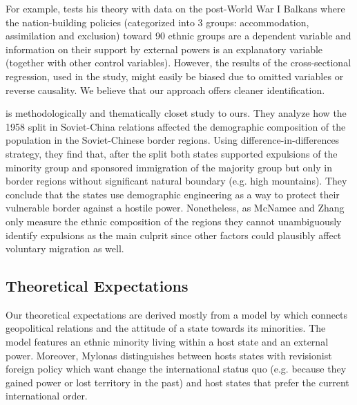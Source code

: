 For example, \citet{mylonas_politics_2013} tests his theory with data on the post-World War I Balkans where the nation-building policies (categorized into 3 groups: accommodation, assimilation and exclusion)  toward  90 ethnic groups are a dependent variable and information on their support by external powers is an explanatory variable (together with other control variables). However, the results of the cross-sectional regression, used in the study, might easily be biased due to omitted variables or reverse causality. We believe that our approach offers cleaner identification.



\citet{mcnamee_demographic_2019} is methodologically and thematically closet study to ours. They analyze how the 1958 split in Soviet-China relations affected the demographic composition of the population in the Soviet-Chinese border regions.
Using difference-in-differences strategy, they find that, after the split  both states supported expulsions  of the minority group and sponsored immigration of the majority group but only in border regions without significant natural boundary (e.g. high mountains). They conclude that the states use demographic engineering as a way to protect their vulnerable border against a hostile power. Nonetheless, as McNamee and Zhang only measure the ethnic composition of the regions they cannot unambiguously identify expulsions as the main culprit since other factors could plausibly affect voluntary migration as well. %


\subsection{Theoretical Expectations}
Our theoretical expectations are  derived mostly from a model by    \citet{mylonas_politics_2013} which connects geopolitical relations and  the attitude of a state towards its minorities. The model features an ethnic minority living within a host state and  an external power. Moreover, Mylonas distinguishes between hosts states with revisionist foreign policy which want change the international status quo (e.g. because they gained power or lost territory in the past) and host states that prefer the current international order. 

